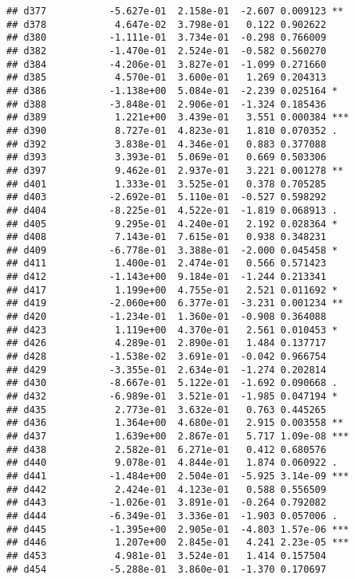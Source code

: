 \documentclass[
]{article}
\begin{document}
\begin{verbatim}
## d377           -5.627e-01  2.158e-01  -2.607 0.009123 ** 
## d378            4.647e-02  3.798e-01   0.122 0.902622    
## d380           -1.111e-01  3.734e-01  -0.298 0.766009    
## d382           -1.470e-01  2.524e-01  -0.582 0.560270    
## d384           -4.206e-01  3.827e-01  -1.099 0.271660    
## d385            4.570e-01  3.600e-01   1.269 0.204313    
## d386           -1.138e+00  5.084e-01  -2.239 0.025164 *  
## d388           -3.848e-01  2.906e-01  -1.324 0.185436    
## d389            1.221e+00  3.439e-01   3.551 0.000384 ***
## d390            8.727e-01  4.823e-01   1.810 0.070352 .  
## d392            3.838e-01  4.346e-01   0.883 0.377088    
## d393            3.393e-01  5.069e-01   0.669 0.503306    
## d397            9.462e-01  2.937e-01   3.221 0.001278 ** 
## d401            1.333e-01  3.525e-01   0.378 0.705285    
## d403           -2.692e-01  5.110e-01  -0.527 0.598292    
## d404           -8.225e-01  4.522e-01  -1.819 0.068913 .  
## d405            9.295e-01  4.240e-01   2.192 0.028364 *  
## d408            7.143e-01  7.615e-01   0.938 0.348231    
## d409           -6.778e-01  3.388e-01  -2.000 0.045458 *  
## d411            1.400e-01  2.474e-01   0.566 0.571423    
## d412           -1.143e+00  9.184e-01  -1.244 0.213341    
## d417            1.199e+00  4.755e-01   2.521 0.011692 *  
## d419           -2.060e+00  6.377e-01  -3.231 0.001234 ** 
## d420           -1.234e-01  1.360e-01  -0.908 0.364088    
## d423            1.119e+00  4.370e-01   2.561 0.010453 *  
## d426            4.289e-01  2.890e-01   1.484 0.137717    
## d428           -1.538e-02  3.691e-01  -0.042 0.966754    
## d429           -3.355e-01  2.634e-01  -1.274 0.202814    
## d430           -8.667e-01  5.122e-01  -1.692 0.090668 .  
## d432           -6.989e-01  3.521e-01  -1.985 0.047194 *  
## d435            2.773e-01  3.632e-01   0.763 0.445265    
## d436            1.364e+00  4.680e-01   2.915 0.003558 ** 
## d437            1.639e+00  2.867e-01   5.717 1.09e-08 ***
## d438            2.582e-01  6.271e-01   0.412 0.680576    
## d440            9.078e-01  4.844e-01   1.874 0.060922 .  
## d441           -1.484e+00  2.504e-01  -5.925 3.14e-09 ***
## d442            2.424e-01  4.123e-01   0.588 0.556509    
## d443           -1.026e-01  3.891e-01  -0.264 0.792082    
## d444           -6.349e-01  3.336e-01  -1.903 0.057006 .  
## d445           -1.395e+00  2.905e-01  -4.803 1.57e-06 ***
## d446            1.207e+00  2.845e-01   4.241 2.23e-05 ***
## d453            4.981e-01  3.524e-01   1.414 0.157504    
## d454           -5.288e-01  3.860e-01  -1.370 0.170697    

\end{verbatim}
\end{document}
